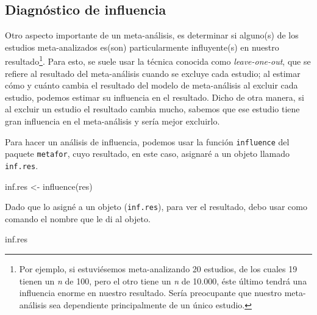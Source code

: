 \documentclass[
  bookmarksnumbered]{article}
\newenvironment{Shaded}{\begin{snugshade}}{\end{snugshade}}
\newcommand{\FunctionTok}[1]{\textcolor[rgb]{0.39,0.29,0.61}{#1}}
\newcommand{\NormalTok}[1]{\textcolor[rgb]{0.12,0.11,0.11}{#1}}
\newcommand{\OtherTok}[1]{\textcolor[rgb]{0.00,0.43,0.16}{#1}}
\begin{document}
\hypertarget{diagnuxf3stico-de-influencia}{%
\subsection{Diagnóstico de influencia}\label{diagnuxf3stico-de-influencia}}

Otro aspecto importante de un meta-análisis, es determinar si alguno(s) de los estudios meta-analizados es(son) particularmente influyente(s) en nuestro resultado\footnote{Por ejemplo, si estuviésemos meta-analizando 20 estudios, de los cuales 19 tienen un \emph{n} de 100, pero el otro tiene un \emph{n} de 10.000, éste último tendrá una influencia enorme en nuestro resultado. Sería preocupante que nuestro meta-análisis sea dependiente principalmente de un único estudio.}. Para esto, se suele usar la técnica conocida como \emph{leave-one-out}, que se refiere al resultado del meta-análisis cuando se excluye cada estudio; al estimar cómo y cuánto cambia el resultado del modelo de meta-análisis al excluir cada estudio, podemos estimar su influencia en el resultado. Dicho de otra manera, si al excluir un estudio el resultado cambia mucho, sabemos que ese estudio tiene gran influencia en el meta-análisis y sería mejor excluirlo.

Para hacer un análisis de influencia, podemos usar la función \texttt{influence} del paquete \texttt{metafor}, cuyo resultado, en este caso, asignaré a un objeto llamado \texttt{inf.res}.

\begin{Shaded}
\begin{Highlighting}[]
\NormalTok{inf.res }\OtherTok{\textless{}{-}} \FunctionTok{influence}\NormalTok{(res)}
\end{Highlighting}
\end{Shaded}

Dado que lo asigné a un objeto (\texttt{inf.res}), para ver el resultado, debo usar como comando el nombre que le di al objeto.

\begin{Shaded}
\begin{Highlighting}[]
\NormalTok{inf.res}
\end{Highlighting}
\end{Shaded}
\end{document}
